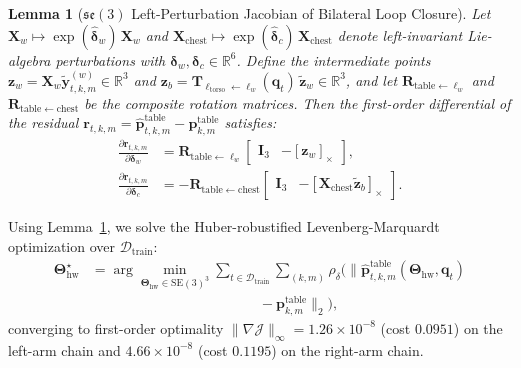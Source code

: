 \documentclass[10pt,journal]{IEEEtran}
\newtheorem{lemma}{Lemma}
\begin{document}
\begin{lemma}[$\mathfrak{se}(3)$ Left-Perturbation Jacobian of Bilateral Loop Closure]
\label{lem:jacobian}
Let $\mathbf{X}_w \mapsto \exp(\hat{\boldsymbol{\delta}}_w)\,\mathbf{X}_w$ and $\mathbf{X}_{\mathrm{chest}} \mapsto \exp(\hat{\boldsymbol{\delta}}_c)\,\mathbf{X}_{\mathrm{chest}}$ denote left-invariant Lie-algebra perturbations with $\boldsymbol{\delta}_w, \boldsymbol{\delta}_c \in \mathbb{R}^6$. Define the intermediate points $\mathbf{z}_w = \mathbf{X}_w \tilde{\mathbf{y}}_{t,k,m}^{(w)} \in \mathbb{R}^3$ and $\mathbf{z}_b = \mathbf{T}_{\ell_{\mathrm{torso}}\leftarrow \ell_w}(\mathbf{q}_t)\,\tilde{\mathbf{z}}_w \in \mathbb{R}^3$, and let $\mathbf{R}_{\mathrm{table}\leftarrow \ell_w}$ and $\mathbf{R}_{\mathrm{table}\leftarrow \mathrm{chest}}$ be the composite rotation matrices. Then the first-order differential of the residual $\mathbf{r}_{t,k,m} = \hat{\mathbf{p}}_{t,k,m}^{\mathrm{table}} - \mathbf{p}_{k,m}^{\mathrm{table}}$ satisfies:
\begin{align}
    \frac{\partial \mathbf{r}_{t,k,m}}{\partial \boldsymbol{\delta}_w} &= \mathbf{R}_{\mathrm{table}\leftarrow \ell_w} \begin{bmatrix} \mathbf{I}_3 & -[\mathbf{z}_w]_\times \end{bmatrix}, \nonumber \\
    \frac{\partial \mathbf{r}_{t,k,m}}{\partial \boldsymbol{\delta}_c} &= -\mathbf{R}_{\mathrm{table}\leftarrow \mathrm{chest}} \begin{bmatrix} \mathbf{I}_3 & -[\mathbf{X}_{\mathrm{chest}}\tilde{\mathbf{z}}_b]_\times \end{bmatrix}.
    \label{eq:jacobians}
\end{align}
\end{lemma}

Using Lemma~\ref{lem:jacobian}, we solve the Huber-robustified Levenberg-Marquardt optimization over $\mathcal{D}_{\mathrm{train}}$:
\begin{equation}
\begin{aligned}
    \boldsymbol{\Theta}_{\mathrm{hw}}^{\star} &= \arg\min_{\boldsymbol{\Theta}_{\mathrm{hw}} \in \mathrm{SE}(3)^3} \sum_{t \in \mathcal{D}_{\mathrm{train}}} \sum_{(k,m)} \rho_{\delta}\!\Big( \big\| \hat{\mathbf{p}}_{t,k,m}^{\mathrm{table}}(\boldsymbol{\Theta}_{\mathrm{hw}}, \mathbf{q}_t) \\
    &\qquad\qquad\qquad\qquad\qquad\qquad - \mathbf{p}_{k,m}^{\mathrm{table}} \big\|_2 \Big),
\end{aligned}
\label{eq:huber_opt}
\end{equation}
converging to first-order optimality $\|\nabla \mathcal{J}\|_\infty = 1.26 \times 10^{-8}$ (cost $0.0951$) on the left-arm chain and $4.66 \times 10^{-8}$ (cost $0.1195$) on the right-arm chain.
\end{document}
